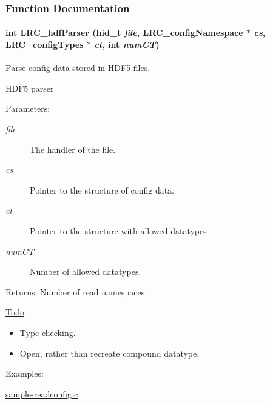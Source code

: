 \subsubsection{Function Documentation}
\hypertarget{group___l_r_c__parser_g3cbf6e172a98da00ec8fd0b301b4b8f9}{
\paragraph[{LRC\_\-hdfParser}]{\setlength{\rightskip}{0pt plus 5cm}int LRC\_\-hdfParser (hid\_\-t {\em file}, \/  {\bf LRC\_\-configNamespace} $\ast$ {\em cs}, \/  {\bf LRC\_\-configTypes} $\ast$ {\em ct}, \/  int {\em numCT})}\hfill}
\label{group___l_r_c__parser_g3cbf6e172a98da00ec8fd0b301b4b8f9}


Parse config data stored in HDF5 files. 

HDF5 parser

\begin{Desc}
\item[Parameters:]
\begin{description}
\item[{\em file}]The handler of the file.\item[{\em cs}]Pointer to the structure of config data.\item[{\em ct}]Pointer to the structure with allowed datatypes.\item[{\em numCT}]Number of allowed datatypes.\end{description}
\end{Desc}
\begin{Desc}
\item[Returns:]Number of read namespaces.\end{Desc}
\begin{Desc}
\item[\hyperlink{todo__todo000005}{Todo}]\begin{itemize}
\item Type checking.\item Open, rather than recreate compound datatype.\end{itemize}
\end{Desc}
\begin{Desc}
\item[Examples: ]\par
\hyperlink{sample-readconfig_8c-example}{sample-readconfig.c}.\end{Desc}


